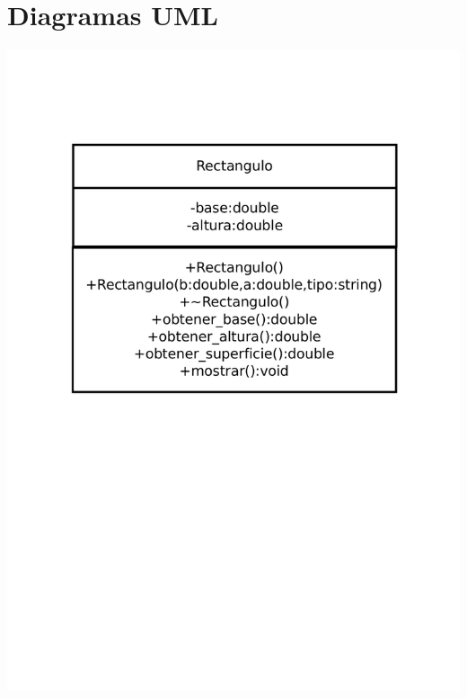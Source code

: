 \documentclass[a4paper,11pt]{article}
\begin{document}
\section{Diagramas UML}
\includegraphics[scale=0.3]{rectangulo.pdf}
\end{document}
